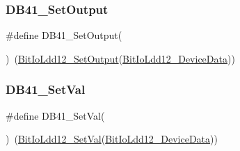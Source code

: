 \mbox{\label{group___d_b41__module_ga5c1975bcc0f0c43162e4c157d3c60fa4}} 
\subsubsection{\texorpdfstring{D\+B41\+\_\+\+Set\+Output}{DB41\_SetOutput}}
{\footnotesize\ttfamily \#define D\+B41\+\_\+\+Set\+Output(\begin{DoxyParamCaption}{ }\end{DoxyParamCaption})~(\hyperlink{group___bit_io_ldd12__module_gab9c2b2a95e81ed484e4328f795f0e827}{Bit\+Io\+Ldd12\+\_\+\+Set\+Output}(\hyperlink{group___bit_io_ldd12__module_ga7332a1a453879ccef57a59ed20d8fee5}{Bit\+Io\+Ldd12\+\_\+\+Device\+Data}))}

\mbox{\label{group___d_b41__module_ga9e42f8d7a6c59804db4317d07de737f2}} 
\subsubsection{\texorpdfstring{D\+B41\+\_\+\+Set\+Val}{DB41\_SetVal}}
{\footnotesize\ttfamily \#define D\+B41\+\_\+\+Set\+Val(\begin{DoxyParamCaption}{ }\end{DoxyParamCaption})~(\hyperlink{group___bit_io_ldd12__module_ga2cdd9908f20433ebead9d031e6abe07c}{Bit\+Io\+Ldd12\+\_\+\+Set\+Val}(\hyperlink{group___bit_io_ldd12__module_ga7332a1a453879ccef57a59ed20d8fee5}{Bit\+Io\+Ldd12\+\_\+\+Device\+Data}))}

